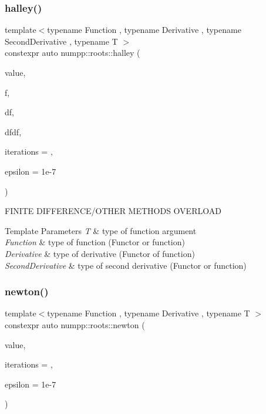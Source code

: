 \subsubsection{\texorpdfstring{halley()}{halley()}\hspace{0.1cm}{\footnotesize\ttfamily [2/2]}}
{\footnotesize\ttfamily template$<$typename Function , typename Derivative , typename Second\+Derivative , typename T $>$ \\
constexpr auto numpp\+::roots\+::halley (\begin{DoxyParamCaption}\item[{T \&\&}]{value,  }\item[{Function}]{f,  }\item[{Derivative}]{df,  }\item[{Second\+Derivative}]{dfdf,  }\item[{std\+::size\+\_\+t}]{iterations = {},  }\item[{const double}]{epsilon = {\ttfamily 1e-\/7} }\end{DoxyParamCaption})}

F\+I\+N\+I\+TE D\+I\+F\+F\+E\+R\+E\+N\+C\+E/\+O\+T\+H\+ER M\+E\+T\+H\+O\+DS O\+V\+E\+R\+L\+O\+AD


\begin{DoxyTemplParams}{Template Parameters}
{\em T} & type of function argument \\
\hline
{\em Function} & type of function (Functor or function) \\
\hline
{\em Derivative} & type of derivative (Functor of function) \\
\hline
{\em Second\+Derivative} & type of second derivative (Functor or function)\\
\hline
\end{DoxyTemplParams}
\mbox{\label{group__numpp__roots_ga756a768c79701c5506809765b24f89a0}} 
\subsubsection{\texorpdfstring{newton()}{newton()}\hspace{0.1cm}{\footnotesize\ttfamily [1/3]}}
{\footnotesize\ttfamily template$<$typename Function , typename Derivative , typename T $>$ \\
constexpr auto numpp\+::roots\+::newton (\begin{DoxyParamCaption}\item[{T \&\&}]{value,  }\item[{std\+::size\+\_\+t}]{iterations = {},  }\item[{const double}]{epsilon = {\ttfamily 1e-\/7} }\end{DoxyParamCaption})}

